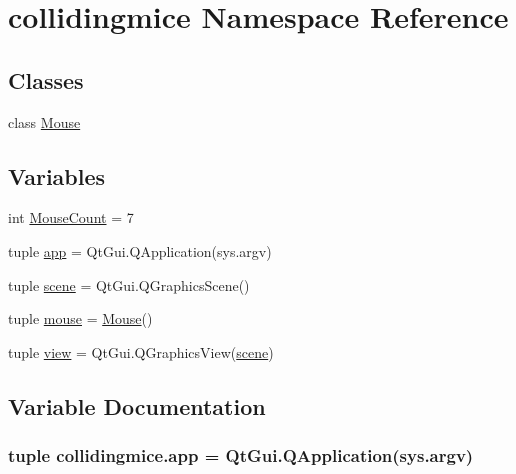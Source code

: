 \hypertarget{namespacecollidingmice}{}\section{collidingmice Namespace Reference}
\label{namespacecollidingmice}
\subsection*{Classes}
\begin{DoxyCompactItemize}
\item 
class \hyperlink{classcollidingmice_1_1Mouse}{Mouse}
\end{DoxyCompactItemize}
\subsection*{Variables}
\begin{DoxyCompactItemize}
\item 
int \hyperlink{namespacecollidingmice_aa450d8145b22476797ec5081b2546b01}{Mouse\+Count} = 7
\item 
tuple \hyperlink{namespacecollidingmice_af0bc3116a050cbc9625148053f1f1ba4}{app} = Qt\+Gui.\+Q\+Application(sys.\+argv)
\item 
tuple \hyperlink{namespacecollidingmice_a912eae13e653411ba83d22c6a723f8c5}{scene} = Qt\+Gui.\+Q\+Graphics\+Scene()
\item 
tuple \hyperlink{namespacecollidingmice_a5b37737f72e07902bc9ec51213191963}{mouse} = \hyperlink{classcollidingmice_1_1Mouse}{Mouse}()
\item 
tuple \hyperlink{namespacecollidingmice_aa8f3acfbd3fd7eec3aa1372a11f6a53f}{view} = Qt\+Gui.\+Q\+Graphics\+View(\hyperlink{namespacecollidingmice_a912eae13e653411ba83d22c6a723f8c5}{scene})
\end{DoxyCompactItemize}


\subsection{Variable Documentation}
\hypertarget{namespacecollidingmice_af0bc3116a050cbc9625148053f1f1ba4}{}
\subsubsection[{app}]{\setlength{\rightskip}{0pt plus 5cm}tuple collidingmice.\+app = Qt\+Gui.\+Q\+Application(sys.\+argv)}\label{namespacecollidingmice_af0bc3116a050cbc9625148053f1f1ba4}
\hypertarget{namespacecollidingmice_a5b37737f72e07902bc9ec51213191963}{}
